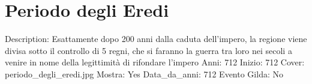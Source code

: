 \section{Periodo degli Eredi}\label{periodo-degli-eredi}

Description: Esattamente dopo 200 anni dalla caduta dell'impero, la
regione viene divisa sotto il controllo di 5 regni, che si faranno la
guerra tra loro nei secoli a venire in nome della legittimità di
rifondare l'impero Anni: 712 Inizio: 712 Cover:
periodo\_degli\_eredi.jpg Mostra: Yes Data\_da\_anni: 712 Evento Gilda:
No
